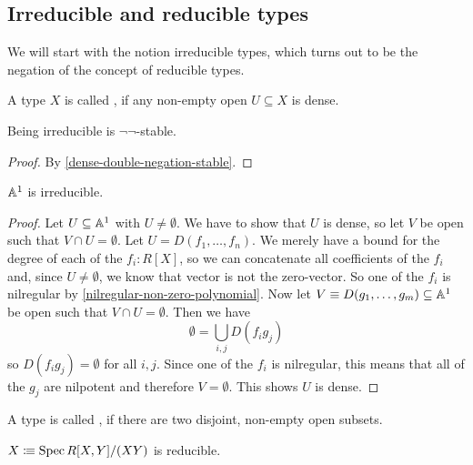 \subsection{Irreducible and reducible types}

We will start with the notion irreducible types,
which turns out to be the negation of the concept of reducible types.

\begin{definition}%
  \label{irred}
  A type $X$ is called ,
  if any non-empty open $U\subseteq X$ is dense.
\end{definition}

\begin{proposition}%
  \label{irred-double-negation-stable}
  Being irreducible is $\neg\neg$-stable.
\end{proposition}

\begin{proof}
  By \cref{dense-double-negation-stable}.  
\end{proof}

\begin{proposition}%
  \label{A1-irreducible}
  $\mathbb{A}^1$ is irreducible.
\end{proposition}

\begin{proof}
  Let $U\subseteq \mathbb{A}^1$ with $U\neq \emptyset$.
  We have to show that $U$ is dense, so let $V$ be open such that $V\cap U=\emptyset$.
  Let $U=D(f_1,\dots,f_n)$.
  We merely have a bound for the degree of each of the $f_i:R[X]$,
  so we can concatenate all coefficients of the $f_i$ and, since $U\neq \emptyset$,
  we know that vector is not the zero-vector.
  So one of the $f_i$ is nilregular by \cref{nilregular-non-zero-polynomial}.
  Now let $V\equiv D(g_1,\dots,g_m)\subseteq \mathbb{A}^1$ be open such that $V\cap U=\emptyset$.
  Then we have
  \[ \emptyset=\bigcup_{i,j} D(f_ig_j) \]
  so $D(f_ig_j)=\emptyset$ for all $i,j$.
  Since one of the $f_i$ is nilregular,
  this means that all of the $g_j$ are nilpotent and therefore $V=\emptyset$.
  This shows $U$ is dense.
\end{proof}

\begin{definition}
  A type is called , if there are two disjoint, non-empty open subsets.
\end{definition}

\begin{proposition}
  $X\vcentcolon\mspace{-1.2mu}\equiv \operatorname{Spec} R[X,Y]/(XY)$ is reducible.
\end{proposition}

